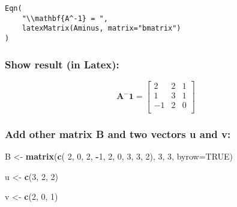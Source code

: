 \documentclass[
  10pt,
  a4paper,
]{article}
\newenvironment{Shaded}{\begin{snugshade}}{\end{snugshade}}
\newcommand{\AttributeTok}[1]{\textcolor[rgb]{0.13,0.29,0.53}{#1}}
\newcommand{\ConstantTok}[1]{\textcolor[rgb]{0.56,0.35,0.01}{#1}}
\newcommand{\DecValTok}[1]{\textcolor[rgb]{0.00,0.00,0.81}{#1}}
\newcommand{\FunctionTok}[1]{\textcolor[rgb]{0.13,0.29,0.53}{\textbf{#1}}}
\newcommand{\NormalTok}[1]{#1}
\newcommand{\OtherTok}[1]{\textcolor[rgb]{0.56,0.35,0.01}{#1}}
\newcommand{\SpecialCharTok}[1]{\textcolor[rgb]{0.81,0.36,0.00}{\textbf{#1}}}
\begin{document}
\begin{verbatim}
Eqn(
    "\\mathbf{A^-1} = ",
    latexMatrix(Aminus, matrix="bmatrix")
)
\end{verbatim}

\hypertarget{show-result-in-latex}{%
\subsubsection{Show result (in Latex):}\label{show-result-in-latex}}

\begin{equation*}
\mathbf{A^-1} = \begin{bmatrix} 
 2 &  2 &  1 \\ 
 1 &  3 &  1 \\ 
-1 &  2 &  0 \\ 
\end{bmatrix}
\end{equation*}

\hypertarget{add-other-matrix-b-and-two-vectors-u-and-v}{%
\subsubsection{Add other matrix B and two vectors u and
v:}\label{add-other-matrix-b-and-two-vectors-u-and-v}}

\begin{Shaded}
\begin{Highlighting}[]
\NormalTok{B }\OtherTok{\textless{}{-}} \FunctionTok{matrix}\NormalTok{(}\FunctionTok{c}\NormalTok{( }\DecValTok{2}\NormalTok{, }\DecValTok{0}\NormalTok{, }\DecValTok{2}\NormalTok{,}
              \SpecialCharTok{{-}}\DecValTok{1}\NormalTok{, }\DecValTok{2}\NormalTok{, }\DecValTok{0}\NormalTok{,}
               \DecValTok{3}\NormalTok{, }\DecValTok{3}\NormalTok{, }\DecValTok{2}\NormalTok{), }\DecValTok{3}\NormalTok{, }\DecValTok{3}\NormalTok{, }\AttributeTok{byrow=}\ConstantTok{TRUE}\NormalTok{)}
\end{Highlighting}
\end{Shaded}

\begin{Shaded}
\begin{Highlighting}[]
\NormalTok{u }\OtherTok{\textless{}{-}} \FunctionTok{c}\NormalTok{(}\DecValTok{3}\NormalTok{, }\DecValTok{2}\NormalTok{, }\DecValTok{2}\NormalTok{)}
\end{Highlighting}
\end{Shaded}

\begin{Shaded}
\begin{Highlighting}[]
\NormalTok{v }\OtherTok{\textless{}{-}} \FunctionTok{c}\NormalTok{(}\DecValTok{2}\NormalTok{, }\DecValTok{0}\NormalTok{, }\DecValTok{1}\NormalTok{)}
\end{Highlighting}
\end{Shaded}
\end{document}
